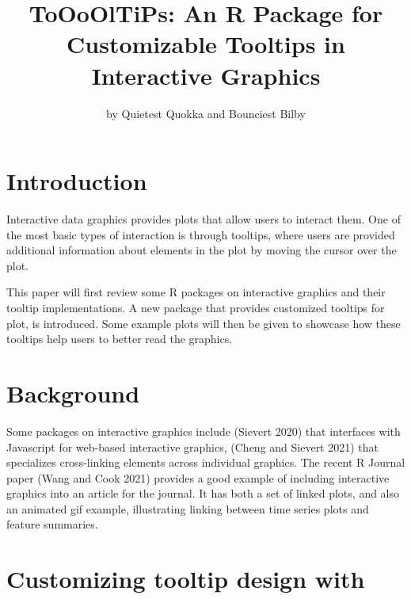 \title{ToOoOlTiPs: An R Package for Customizable Tooltips in Interactive Graphics}
\author{by Quietest Quokka and Bounciest Bilby}

\maketitle


\hypertarget{introduction}{%
\section{Introduction}\label{introduction}}

Interactive data graphics provides plots that allow users to interact them. One of the most basic types of interaction is through tooltips, where users are provided additional information about elements in the plot by moving the cursor over the plot.

This paper will first review some R packages on interactive graphics and their tooltip implementations. A new package  that provides customized tooltips for plot, is introduced. Some example plots will then be given to showcase how these tooltips help users to better read the graphics.

\hypertarget{background}{%
\section{Background}\label{background}}

Some packages on interactive graphics include  (Sievert 2020) that interfaces with Javascript for web-based interactive graphics,  (Cheng and Sievert 2021) that specializes cross-linking elements across individual graphics. The recent R Journal paper  (Wang and Cook 2021) provides a good example of including interactive graphics into an article for the journal. It has both a set of linked plots, and also an animated gif example, illustrating linking between time series plots and feature summaries.

\hypertarget{customizing-tooltip-design-with}{%
\section{\texorpdfstring{Customizing tooltip design with }{Customizing tooltip design with }}\label{customizing-tooltip-design-with}}

